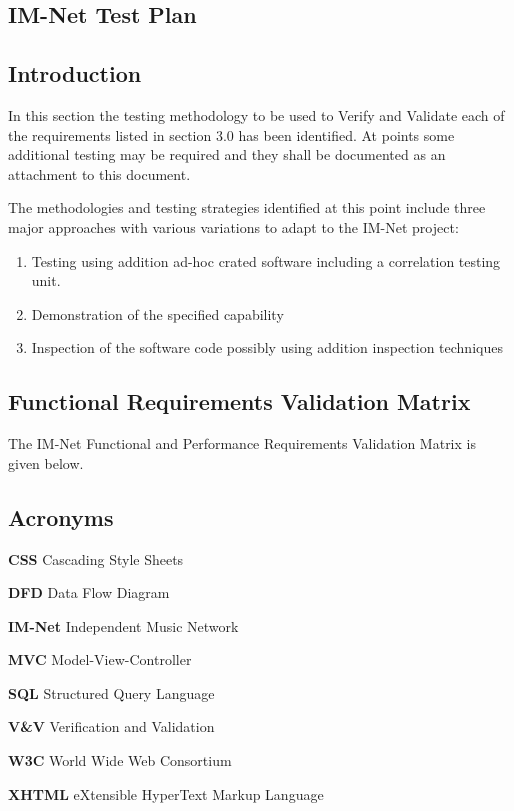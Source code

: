 \documentclass[letterpaper,12pt]{article}
\newcommand{\Section}[1]{\section{#1} \setcounter{figure}{0}}
\begin{document}
{\eject 

\textcolor{section}{\Section{IM-Net Test Plan}}

\textcolor{subsection}{\subsection{Introduction}}

In this section the testing methodology to be used to Verify and Validate each of the requirements listed in section 3.0 has been identified. At points some additional testing may be required and they shall be documented as an attachment to this document. 

The methodologies and testing strategies identified at this point include three major approaches with various variations to adapt to the IM-Net project:

\begin{enumerate}
\item  Testing using addition ad-hoc crated software including a correlation testing unit.

\item  Demonstration of the specified capability

\item  Inspection of the software code possibly using addition inspection techniques
\end{enumerate}

 
\textcolor{subsection}{\subsection{Functional Requirements Validation Matrix}}
The IM-Net Functional and Performance Requirements Validation Matrix is given below.
\eject 

\appendix

\textcolor{section}{\Section{Acronyms}}

\textbf{CSS} Cascading Style Sheets

\textbf{DFD} Data Flow Diagram

\textbf{IM-Net} Independent Music Network

\textbf{MVC} Model-View-Controller

\textbf{SQL} Structured Query Language

\textbf{V\&V} Verification and Validation

\textbf{W3C} World Wide Web Consortium

\textbf{XHTML} eXtensible HyperText Markup Language

}
\end{document}
